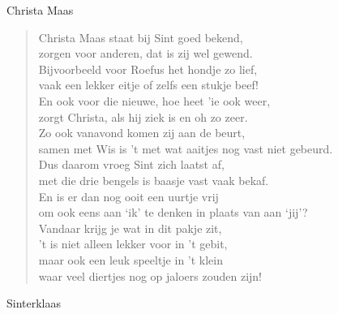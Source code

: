 \documentclass[12pt]{brief}
\date{4 december 2004}
\begin{document}
\begin{letter}{Christa Maas}

\opening{}


\begin{verse}

Christa Maas staat bij Sint goed bekend,\\
zorgen voor anderen, dat is zij wel gewend.\\
Bijvoorbeeld voor Roefus het hondje zo lief,\\
vaak een lekker eitje of zelfs een stukje beef!\\[0.5em]

En ook voor die nieuwe, hoe heet 'ie ook weer,\\
zorgt Christa, als hij ziek is en oh zo zeer.\\
Zo ook vanavond komen zij aan de beurt,\\
samen met Wis is 't met wat aaitjes nog vast niet gebeurd.\\[0.5em]

Dus daarom vroeg Sint zich laatst af,\\
met die drie bengels is baasje vast vaak bekaf.\\
En is er dan nog ooit een uurtje vrij\\
om ook eens aan `ik' te denken in plaats van aan `jij'?\\[0.5em]

Vandaar krijg je wat in dit pakje zit,\\
't is niet alleen lekker voor in 't gebit,\\
maar ook een leuk speeltje in 't klein\\
waar veel diertjes nog op jaloers zouden zijn!\\[2em]

\end{verse}


Sinterklaas


\closing{}

\end{letter}
\end{document}

